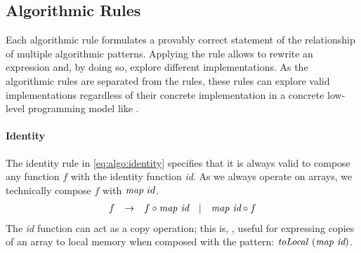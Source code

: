 
\newenvironment{rerule}[1]%
{\begin{equation}\begin{array}{#1}\ignorespaces}%
{\end{array}\end{equation}%
\ignorespacesafterend}

\newenvironment{rerule*}[1]%
{\begin{equation*}\begin{array}{#1}\ignorespaces}%
{\end{array}\end{equation*}%
\ignorespacesafterend}


\newcommand{\comment}[1] {%
\{\text{\small #1}\}%
}

\subsection{Algorithmic Rules}
\label{section:rules:algo}

Each algorithmic rule formulates a provably correct statement of the relationship of multiple algorithmic patterns.
Applying the rule allows to rewrite an expression and, by doing so, explore different implementations.
As the algorithmic rules are separated from the  \OpenCL rules, these rules can explore valid implementations regardless of their concrete implementation in a concrete low-level programming model like \OpenCL.

\paragraph{Identity}
The identity rule in \autoref{eq:algo:identity} specifies that it is always valid to compose any function $f$ with the identity function \emph{id}.
As we always operate on arrays, we technically compose $f$ with $\text{\textit{map}}\ id$.
%
\begin{rerule}{lclcl}
  f & \rightarrow & f \circ \map\ \textit{id} & | & \map\ \textit{id} \circ f
  \label{eq:algo:identity}
\end{rerule}
%
The \textit{id} function can act as a copy operation; this is, \eg, useful for expressing copies of an array to local memory when composed with the \toLocal \OpenCL pattern: $\text{\textit{toLocal}}\ (\text{\textit{map}}\ \textit{id})$.

